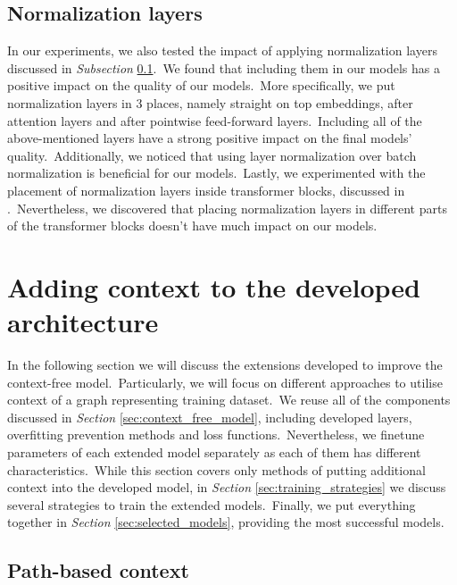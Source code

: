 \documentclass[longabstract, english, mgr]{iithesis}
\theoremstyle{default_theorem_style}\newtheorem{theorem}{Theorem}
\theoremstyle{default_theorem_style}\newtheorem{definition}{Definition}
\begin{document}
\subsection{Normalization layers}\label{subsec:normalization_layers}

In our experiments, we also tested the impact of applying normalization layers discussed in
\textit{Subsection} \ref{subsec:normalization_layers}.\ We found that including them in our models
has a positive impact on the quality of our models.\ More specifically, we put normalization layers in 3 places, namely
straight on top embeddings, after attention layers and after pointwise feed-forward layers.\ Including all of the
above-mentioned layers have a strong positive impact on the final models' quality.\ Additionally, we noticed that
using layer normalization over batch normalization is beneficial for our models.\ Lastly, we experimented with the
placement of normalization layers inside transformer blocks, discussed in
\cite{layer_normalization_in_transformers}.\ Nevertheless, we discovered that placing normalization layers in
different parts of the transformer blocks doesn't have much impact on our models.

\section{Adding context to the developed architecture}\label{sec:context_models}

In the following section we will discuss the extensions developed to improve the context-free model.\ Particularly, we
will focus on different approaches to utilise context of a graph representing training dataset.\ We reuse all of the
components discussed in \textit{Section} \ref{sec:context_free_model}, including developed layers, overfitting
prevention methods and loss functions.\ Nevertheless, we finetune parameters of each extended model separately as
each of them has different characteristics.\ While this section covers only methods of putting additional context
into the developed model, in \textit{Section} \ref{sec:training_strategies} we discuss several strategies to train the
extended models.\ Finally, we put everything together in \textit{Section} \ref{sec:selected_models}, providing the most
successful models.

\subsection{Path-based context}
\end{document}
